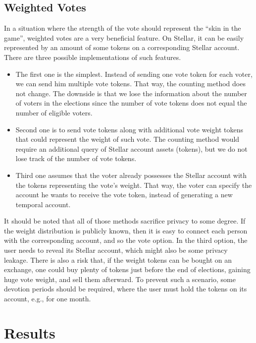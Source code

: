 \documentclass[applsci,article,accept,moreauthors,pdftex]{Definitions/mdpi}
\begin{document}
\subsection{Weighted Votes}
In a situation where the strength of the vote should represent the ``skin in the game'', weighted votes are a very beneficial feature. On Stellar, it can be easily represented by an amount of some tokens on a corresponding Stellar account. There are three possible implementations of such features. 
\begin{itemize}
    \item The first one is the simplest. Instead of sending one vote token for each voter, we can send him multiple vote tokens. That way, the counting method does not change. The downside is that we lose the information about the number of voters in the elections since the number of vote tokens does not equal the number of eligible voters.
    \item Second one is to send vote tokens along with additional {vote weight tokens} that could represent the weight of such vote. The counting method would require an additional query of Stellar account assets (tokens), but we do not lose track of the number of vote tokens.
    \item Third one assumes that the voter already possesses the Stellar account with the tokens representing the vote's weight. That way, the voter can specify the account he wants to receive the vote token, instead of generating a new temporal account. 
\end{itemize}
 
It should be noted that all of those methods sacrifice privacy to some degree. If the weight distribution is publicly known, then it is easy to connect each person with the corresponding account, and so the vote option. In the third option, the user needs to reveal its Stellar account, which might also be some privacy leakage. There is also a risk that, if the weight tokens can be bought on an exchange, one could buy plenty of tokens just before the end of elections, gaining huge vote weight, and sell them afterward. To prevent such a scenario, some devotion periods should be required, where the user must hold the tokens on its account, e.g., for one month. 

\section{Results}
\label{result}
\vspace{-6pt}
\end{document}
